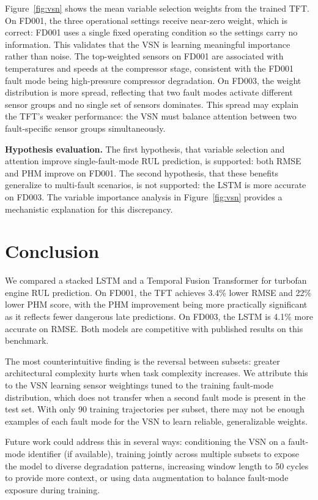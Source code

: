 \documentclass{article}
\begin{document}
Figure~\ref{fig:vsn} shows the mean variable selection weights from the trained TFT. On FD001, the three operational settings receive near-zero weight, which is correct: FD001 uses a single fixed operating condition so the settings carry no information. This validates that the VSN is learning meaningful importance rather than noise. The top-weighted sensors on FD001 are associated with temperatures and speeds at the compressor stage, consistent with the FD001 fault mode being high-pressure compressor degradation. On FD003, the weight distribution is more spread, reflecting that two fault modes activate different sensor groups and no single set of sensors dominates. This spread may explain the TFT's weaker performance: the VSN must balance attention between two fault-specific sensor groups simultaneously.

\textbf{Hypothesis evaluation.}
The first hypothesis, that variable selection and attention improve single-fault-mode RUL prediction, is supported: both RMSE and PHM improve on FD001. The second hypothesis, that these benefits generalize to multi-fault scenarios, is not supported: the LSTM is more accurate on FD003. The variable importance analysis in Figure~\ref{fig:vsn} provides a mechanistic explanation for this discrepancy.

\section{Conclusion}

We compared a stacked LSTM and a Temporal Fusion Transformer for turbofan engine RUL prediction. On FD001, the TFT achieves 3.4\% lower RMSE and 22\% lower PHM score, with the PHM improvement being more practically significant as it reflects fewer dangerous late predictions. On FD003, the LSTM is 4.1\% more accurate on RMSE. Both models are competitive with published results on this benchmark.

The most counterintuitive finding is the reversal between subsets: greater architectural complexity hurts when task complexity increases. We attribute this to the VSN learning sensor weightings tuned to the training fault-mode distribution, which does not transfer when a second fault mode is present in the test set. With only 90 training trajectories per subset, there may not be enough examples of each fault mode for the VSN to learn reliable, generalizable weights.

Future work could address this in several ways: conditioning the VSN on a fault-mode identifier (if available), training jointly across multiple subsets to expose the model to diverse degradation patterns, increasing window length to 50 cycles to provide more context, or using data augmentation to balance fault-mode exposure during training.
\end{document}
